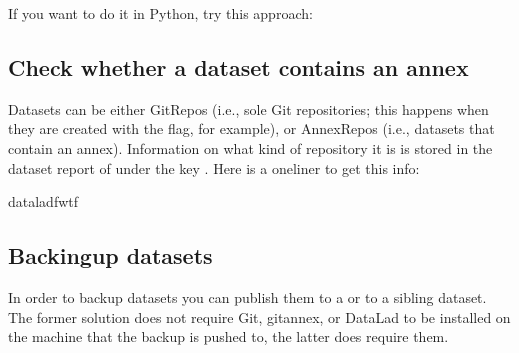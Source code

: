 \sphinxAtStartPar
If you want to do it in Python, try this approach:

\begin{sphinxVerbatim}[commandchars=\\\{\}]
   

  
        
\end{sphinxVerbatim}


\subsection{Check whether a dataset contains an annex}
\label{\detokenize{basics/101-146-gists:check-whether-a-dataset-contains-an-annex}}
\sphinxAtStartPar
Datasets can be either GitRepos (i.e., sole Git repositories; this happens when
they are created with the  flag, for example), or AnnexRepos
(i.e., datasets that contain an annex). Information on what kind of repository it
is is stored in the dataset report of  under the key .
Here is a one\sphinxhyphen{}liner to get this info:

\begin{sphinxVerbatim}[commandchars=\\\{\}]
datalad\PYGZhy{}fwtf
\end{sphinxVerbatim}

\ignorespaces 

\subsection{Backing\sphinxhyphen{}up datasets}
\label{\detokenize{basics/101-146-gists:backing-up-datasets}}\label{\detokenize{basics/101-146-gists:index-0}}
\sphinxAtStartPar
In order to back\sphinxhyphen{}up datasets you can publish them to a
{\hyperref[\detokenize{glossary:term-Remote-Indexed-Archive-RIA-store}]{}} or to a sibling dataset. The former
solution does not require Git, git\sphinxhyphen{}annex, or DataLad to be installed on the
machine that the back\sphinxhyphen{}up is pushed to, the latter does require them.

